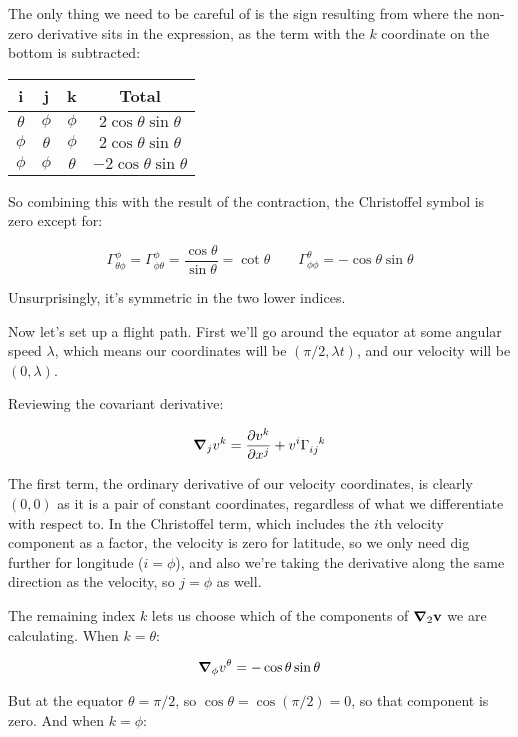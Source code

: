 The only thing we need to be careful of is the sign resulting from where the non-zero derivative sits in the expression, as the term with the $k$ coordinate on the bottom is subtracted:

\begin{center}
    \begin{tabular}{ c|c|c|c }
        i & j & k & Total \\
        \hline
        $\theta$ & $\phi$ & $\phi$ & $2\cos\theta\sin\theta$ \\
        $\phi$ & $\theta$ & $\phi$ & $2\cos\theta\sin\theta$ \\
        $\phi$ & $\phi$ & $\theta$ & $-2\cos\theta\sin\theta$         
    \end{tabular}
\end{center}

So combining this with the result of the contraction, the Christoffel symbol is zero except for:

$$
\Gamma_{\theta \phi}^{\phi} 
= \Gamma_{\phi \theta}^{\phi} 
= \frac{\cos \theta}{\sin \theta}
= \cot \theta
\quad
\quad
\Gamma_{\phi \phi}^{\theta} = -\cos\theta\sin\theta
$$

Unsurprisingly, it's symmetric in the two lower indices.

Now let's set up a flight path. First we'll go around the equator at some angular speed $\lambda$, which means our coordinates will be $(\pi / 2, \lambda t)$, and our velocity will be $(0, \lambda)$.

Reviewing the covariant derivative:

$$
\grad_j v^k
= 
\frac{\partial v^k}{\partial x^j}
+ v^i \Gamma\indices{_i_j^k}
$$

The first term, the ordinary derivative of our velocity coordinates, is clearly $(0, 0)$ as it is a pair of constant coordinates, regardless of what we differentiate with respect to. In the Christoffel term, which includes the $i$th velocity component as a factor, the velocity is zero for latitude, so we only need dig further for longitude ($i=\phi$), and also we're taking the derivative along the same direction as the velocity, so $j=\phi$ as well.

The remaining index $k$ lets us choose which of the components of $\grad_2 \mathbf{v}$ we are calculating. When $k=\theta$:

$$
\grad_{\phi} v^{\theta}
= -\cos\theta\sin\theta
$$

But at the equator $\theta = \pi/2$, so $\cos\theta = \cos(\pi/2) = 0$, so that component is zero. And when $k=\phi$:

